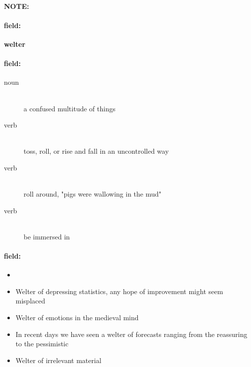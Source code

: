 \documentclass[12pt]{article}
\newenvironment{note}{\paragraph{NOTE:}}{}
\newenvironment{field}{\paragraph{field:}}{}
\begin{document}
\begin{note}
\begin{field}
\textbf{\large welter}
\end{field}


\begin{field}
\begin{description}
\item[noun] \hfill \\ 
a confused multitude of things

\item[verb] \hfill \\ 
toss, roll, or rise and fall in an uncontrolled way

\item[verb] \hfill \\ 
roll around, "pigs were wallowing in the mud"

\item[verb] \hfill \\ 
be immersed in

\end{description}
\end{field}

\begin{field}
\begin{itemize}
\item 
\item Welter of depressing statistics, any hope of improvement might seem misplaced
\item Welter of emotions in the medieval mind
\item In recent days we have seen a welter of forecasts ranging from the reassuring to the pessimistic
\item Welter of irrelevant material
\end{itemize}
\end{field}
\end{note}
\end{document}
